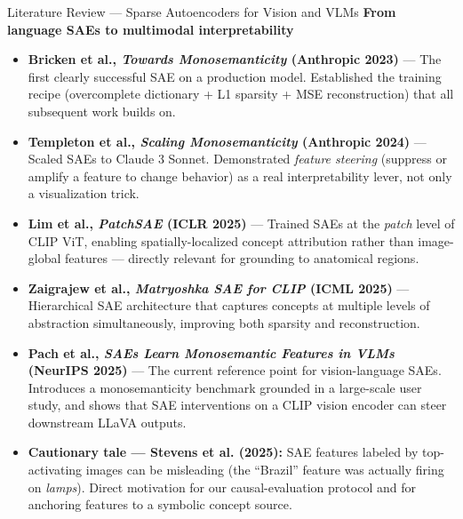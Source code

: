 \documentclass[aspectratio=169,11pt]{beamer}
\begin{document}
\begin{frame}{Literature Review --- Sparse Autoencoders for Vision and VLMs}
    \textbf{From language SAEs to multimodal interpretability}

    \vspace{0.4em}
    \small
    \begin{itemize}
        \item \textbf{Bricken et al., \textit{Towards Monosemanticity} (Anthropic 2023)} --- The first clearly successful SAE on a production model. Established the training recipe (overcomplete dictionary + L1 sparsity + MSE reconstruction) that all subsequent work builds on.

        \item \textbf{Templeton et al., \textit{Scaling Monosemanticity} (Anthropic 2024)} --- Scaled SAEs to Claude 3 Sonnet. Demonstrated \emph{feature steering} (suppress or amplify a feature to change behavior) as a real interpretability lever, not only a visualization trick.

        \item \textbf{Lim et al., \textit{PatchSAE} (ICLR 2025)} --- Trained SAEs at the \emph{patch} level of CLIP ViT, enabling spatially-localized concept attribution rather than image-global features --- directly relevant for grounding to anatomical regions.

        \item \textbf{Zaigrajew et al., \textit{Matryoshka SAE for CLIP} (ICML 2025)} --- Hierarchical SAE architecture that captures concepts at multiple levels of abstraction simultaneously, improving both sparsity and reconstruction.

        \item \textbf{Pach et al., \textit{SAEs Learn Monosemantic Features in VLMs} (NeurIPS 2025)} --- The current reference point for vision-language SAEs. Introduces a monosemanticity benchmark grounded in a large-scale user study, and shows that SAE interventions on a CLIP vision encoder can steer downstream LLaVA outputs.

        \item \textcolor{accentgold}{\textbf{Cautionary tale --- Stevens et al. (2025):}} SAE features labeled by top-activating images can be misleading (the ``Brazil'' feature was actually firing on \emph{lamps}). Direct motivation for our causal-evaluation protocol and for anchoring features to a symbolic concept source.
    \end{itemize}
\end{frame}
\end{document}
